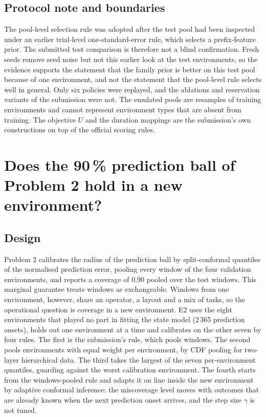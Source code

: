 \subsection{Protocol note and boundaries}
The pool-level selection rule was adopted after the test pool had been inspected under an earlier trial-level one-standard-error rule, which selects a prefix-feature prior. The submitted test comparison is therefore not a blind confirmation. Fresh seeds remove seed noise but not this earlier look at the test environments, so the evidence supports the statement that the family prior is better on this test pool because of one environment, and not the statement that the pool-level rule selects well in general. Only six policies were replayed, and the ablations and reservation variants of the submission were not. The emulated pools are resamples of training environments and cannot represent environment types that are absent from training. The objective $U$ and the duration mappings are the submission's own constructions on top of the official scoring rules.

\section{Does the 90\,\% prediction ball of Problem 2 hold in a new environment?}

\subsection{Design}
Problem 2 calibrates the radius of the prediction ball by split-conformal quantiles of the normalised prediction error\cite{vovk2005,lei2018}, pooling every window of the four validation environments, and reports a coverage of 0.90 pooled over the test windows. This marginal guarantee treats windows as exchangeable. Windows from one environment, however, share an operator, a layout and a mix of tasks, so the operational question is coverage in a new environment. E2 uses the eight environments that played no part in fitting the state model (2\,365 prediction onsets), holds out one environment at a time and calibrates on the other seven by four rules. The first is the submission's rule, which pools windows. The second pools environments with equal weight per environment, by CDF pooling for two-layer hierarchical data\cite{dunn2023}. The third takes the largest of the seven per-environment quantiles, guarding against the worst calibration environment. The fourth starts from the windows-pooled rule and adapts it on line inside the new environment by adaptive conformal inference\cite{gibbs2021}: the miscoverage level moves with outcomes that are already known when the next prediction onset arrives, and the step size $\gamma$ is not tuned.

